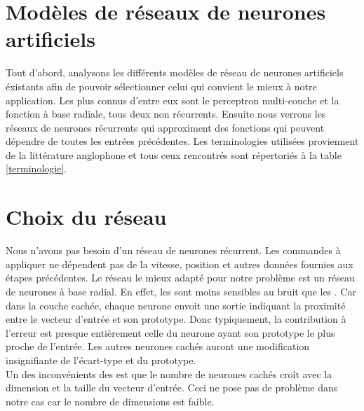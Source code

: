 \documentclass[12pt,a4paper,oneside, titlepage]{article}
\begin{document}


\tableofcontents
\newpage


\section{Modèles de réseaux de neurones artificiels}
\terminologie
Tout d'abord, analysons les différents modèles de réseau de neurones artificiels éxistants afin de pouvoir sélectionner celui qui convient le mieux à notre application.
Les plus connus d'entre eux sont le perceptron multi-couche et la fonction à base radiale, tous deux non récurrents.
Ensuite nous verrons les réseaux de neurones récurrents qui approximent des fonctions qui peuvent dépendre de toutes les entrées précédentes.
Les terminologies utilisées proviennent de la littérature anglophone et tous ceux rencontrés sont répertoriés à la table \ref{terminologie}.


%

%





\section{Choix du réseau}
Nous n'avons pas besoin d'un réseau de neurones récurrent.
Les commandes à appliquer ne dépendent pas de la vitesse, position et autres données fournies aux étapes précédentes.
Le réseau le mieux adapté pour notre problème est un réseau de neurones à base radial.
En effet, les \rbf sont moins sensibles au bruit que les \mlp \cite{adversarial,Gauthier}.%
Car dans la couche cachée, chaque neurone envoit une sortie indiquant la proximité entre le vecteur d'entrée et son prototype.
Donc typiquement, la contribution à l'erreur est presque entièrement celle du neurone ayant son prototype le plus proche de l'entrée.
Les autres neurones cachés auront une modification insignifiante de l'écart-type et du prototype.\\

Un des inconvénients des \rbf est que le nombre de neurones cachés croît avec la dimension et la taille du vecteur d'entrée.
Ceci ne pose pas de problème dans notre cas car le nombre de dimensions est faible.


\end{document}
